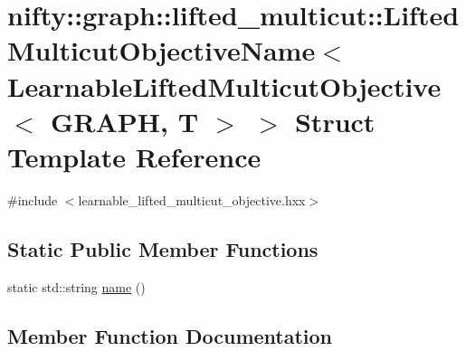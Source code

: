 \hypertarget{structnifty_1_1graph_1_1lifted__multicut_1_1LiftedMulticutObjectiveName_3_01LearnableLiftedMulti73428f6cd4cc305234bfd757fb72d133}{}\section{nifty\+:\+:graph\+:\+:lifted\+\_\+multicut\+:\+:Lifted\+Multicut\+Objective\+Name$<$ Learnable\+Lifted\+Multicut\+Objective$<$ G\+R\+A\+P\+H, T $>$ $>$ Struct Template Reference}
\label{structnifty_1_1graph_1_1lifted__multicut_1_1LiftedMulticutObjectiveName_3_01LearnableLiftedMulti73428f6cd4cc305234bfd757fb72d133}


{\ttfamily \#include $<$learnable\+\_\+lifted\+\_\+multicut\+\_\+objective.\+hxx$>$}

\subsection*{Static Public Member Functions}
\begin{DoxyCompactItemize}
\item 
static std\+::string \hyperlink{structnifty_1_1graph_1_1lifted__multicut_1_1LiftedMulticutObjectiveName_3_01LearnableLiftedMulti73428f6cd4cc305234bfd757fb72d133_afd3ec677a4cbbe406e82350f3792e4d5}{name} ()
\end{DoxyCompactItemize}


\subsection{Member Function Documentation}
\hypertarget{structnifty_1_1graph_1_1lifted__multicut_1_1LiftedMulticutObjectiveName_3_01LearnableLiftedMulti73428f6cd4cc305234bfd757fb72d133_afd3ec677a4cbbe406e82350f3792e4d5}{}

